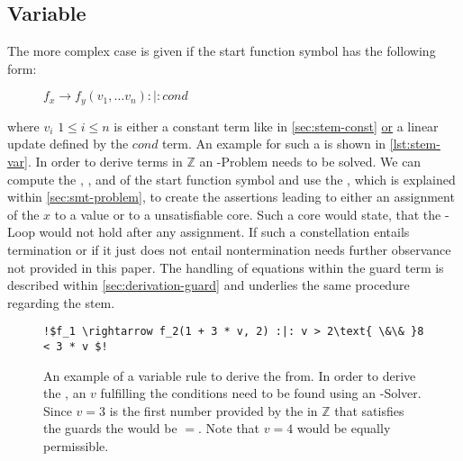 \subsection{Variable \stem}
\label{sec:stem-var}
The more complex case is given if the start function symbol has the following form:
\begin{figure}[H]
	\centering
	$f_x \rightarrow f_y(v_1, \dots v_n) :|: cond$
\end{figure}
where $v_i$ $1 \le i \le n$ is either a constant term like in \autoref{sec:stem-const} \underline{or} a linear update defined by the $cond$ term. An example for such a \stem is shown in \autoref{lst:stem-var}. In order to derive terms in $\mathbb{Z}$ an -Problem needs to be solved. We can compute the \guardmatrix, \guardconstants, \updatematrix and \updateconstants of the start function symbol and use the \smtfactory, which is explained within \autoref{sec:smt-problem}, to create the assertions leading to either an assignment of the \stem $x$ to a value or to a unsatisfiable core. Such a core would state, that the -Loop would not hold after any assignment. If such a constellation entails termination or if it just does not entail nontermination needs further observance not provided in this paper. \newline
The handling of equations within the guard term is described within \autoref{sec:derivation-guard} and underlies the same procedure regarding the stem.

\newsavebox{\stemextwo}%
\newsavebox{\stemextwosecond}%
\begin{figure}[H]
	\begin{lstlisting}[escapechar=!]
	!$f_1 \rightarrow f_2(1 + 3 * v, 2) :|: v > 2\text{ \&\& }8 < 3 * v $!
	\end{lstlisting}	
	\caption{An example of a variable \its rule to derive the \stem from. In order to derive the \stem, an $v$ fulfilling the conditions need to be found using an -Solver. Since $v=3$ is the first number provided by the \solver in $\mathbb{Z}$ that satisfies the guards the \stem would be \usebox{\stemextwo}$=$\usebox{\stemextwosecond}. Note that $v=4$ would be equally permissible.}
	\label{lst:stem-var}
\end{figure}

